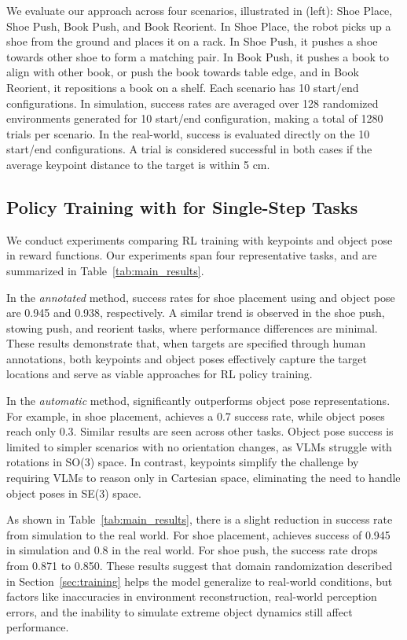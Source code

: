 We evaluate our approach across four scenarios, illustrated in  (left): Shoe Place, Shoe Push, Book Push, and Book Reorient. In Shoe Place, the robot picks up a shoe from the ground and places it on a rack. In Shoe Push, it pushes a shoe towards other shoe to form a matching pair. In Book Push, it pushes a book to align with other book, or push the book towards table edge, and in Book Reorient, it repositions a book on a shelf. Each scenario has 10 start/end configurations. In simulation, success rates are averaged over 128 randomized environments generated for 10 start/end configuration, making a total of 1280 trials per scenario. In the real-world, success is evaluated directly on the 10 start/end configurations. A trial is considered successful in both cases if the average keypoint distance to the target is within 5 cm.



\subsection{Policy Training with \algabrvname for Single-Step Tasks}
We conduct experiments comparing RL training with keypoints and object pose in reward functions. Our experiments span four representative tasks, and are summarized in Table~\ref{tab:main_results}.

In the \textit{annotated} method, success rates for shoe placement using \algabrvname and object pose are 0.945 and 0.938, respectively. A similar trend is observed in the shoe push, stowing push, and reorient tasks, where performance differences are minimal. These results demonstrate that, when targets are specified through human annotations, both keypoints and object poses effectively capture the target locations and serve as viable approaches for RL policy training.

In the \textit{automatic} method, \algabrvname significantly outperforms object pose representations. For example, in shoe placement, \algabrvname achieves a 0.7 success rate, while object poses reach only 0.3. Similar results are seen across other tasks. Object pose success is limited to simpler scenarios with no orientation changes, as VLMs struggle with rotations in SO(3) space. In contrast, keypoints simplify the challenge by requiring VLMs to reason only in Cartesian space, eliminating the need to handle object poses in SE(3) space.



As shown in Table~\ref{tab:main_results}, there is a slight reduction in success rate from simulation to the real world. For shoe placement, \algabrvname achieves success of 0.945 in simulation and 0.8 in the real world. For shoe push, the success rate drops from 0.871 to 0.850. These results suggest that domain randomization described in Section~\ref{sec:training} helps the model generalize to real-world conditions, but factors like inaccuracies in environment reconstruction, real-world perception errors, and the inability to simulate extreme object dynamics still affect performance.



